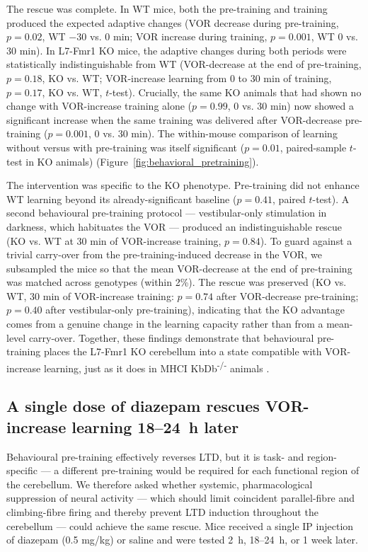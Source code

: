 \documentclass[11pt]{article}
\begin{document}
The rescue was complete. In WT mice, both the pre-training and training
produced the expected adaptive changes (VOR decrease during pre-training,
$p = 0.02$, WT $-30$ vs. 0 min; VOR increase during training, $p = 0.001$,
WT 0 vs. 30 min). In L7-Fmr1 KO mice, the adaptive changes during both
periods were statistically indistinguishable from WT (VOR-decrease at the
end of pre-training, $p = 0.18$, KO vs. WT; VOR-increase learning from 0
to 30 min of training, $p = 0.17$, KO vs. WT, $t$-test). Crucially, the
same KO animals that had shown no change with VOR-increase training alone
($p = 0.99$, 0 vs. 30 min) now showed a significant increase when the
same training was delivered after VOR-decrease pre-training ($p = 0.001$,
0 vs. 30 min). The within-mouse comparison of learning without versus
with pre-training was itself significant ($p = 0.01$, paired-sample
$t$-test in KO animals) (Figure~\ref{fig:behavioral_pretraining}).

The intervention was specific to the KO phenotype. Pre-training did not
enhance WT learning beyond its already-significant baseline ($p = 0.41$,
paired $t$-test). A second behavioural pre-training protocol ---
vestibular-only stimulation in darkness, which habituates the VOR ---
produced an indistinguishable rescue (KO vs. WT at 30 min of VOR-increase
training, $p = 0.84$). To guard against a trivial carry-over from the
pre-training-induced decrease in the VOR, we subsampled the mice so that
the mean VOR-decrease at the end of pre-training was matched across
genotypes (within 2\%). The rescue was preserved (KO vs. WT, 30 min of
VOR-increase training: $p = 0.74$ after VOR-decrease pre-training;
$p = 0.40$ after vestibular-only pre-training), indicating that the KO
advantage comes from a genuine change in the learning capacity rather
than from a mean-level carry-over. Together, these findings demonstrate
that behavioural pre-training places the L7-Fmr1 KO cerebellum into a
state compatible with VOR-increase learning, just as it does in
MHCI KbDb\textsuperscript{-/-} animals \citep{nguyenvu2017saturation}.

\subsection{A single dose of diazepam rescues VOR-increase learning
18--24~h later}

Behavioural pre-training effectively reverses LTD, but it is task- and
region-specific --- a different pre-training would be required for each
functional region of the cerebellum. We therefore asked whether systemic,
pharmacological suppression of neural activity --- which should limit
coincident parallel-fibre and climbing-fibre firing and thereby prevent
LTD induction throughout the cerebellum --- could achieve the same rescue.
Mice received a single IP injection of diazepam (0.5 mg/kg) or saline and
were tested 2~h, 18--24~h, or 1 week later.
\end{document}
